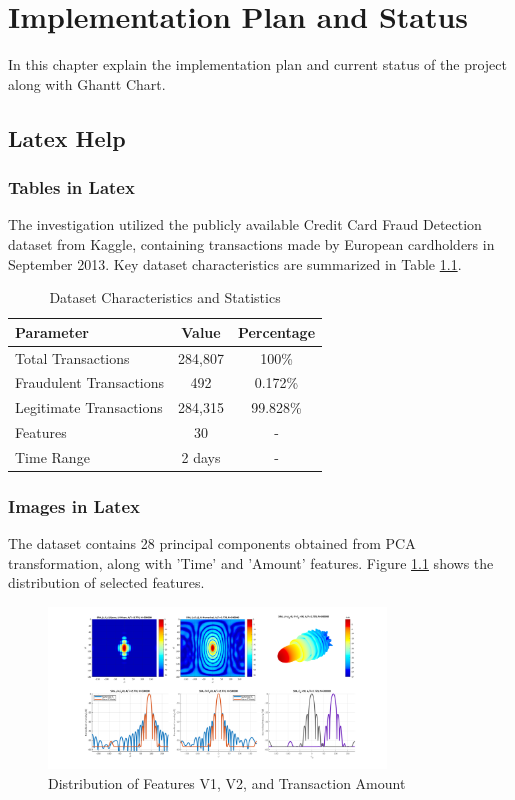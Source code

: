 \chapter{Implementation Plan and Status}
In this chapter explain the implementation plan and current status of the project along with Ghantt Chart.
	
\section{Latex Help}

\subsection{Tables in Latex}
The investigation utilized the publicly available Credit Card Fraud Detection dataset from Kaggle, containing transactions made by European cardholders in September 2013. Key dataset characteristics are summarized in Table \ref{tab:dataset_stats}.

\begin{table}[h!]
\centering
\caption{Dataset Characteristics and Statistics}
\label{tab:dataset_stats}
\begin{tabular}{lcc}
\toprule
\textbf{Parameter} & \textbf{Value} & \textbf{Percentage} \\
\midrule
Total Transactions & 284,807 & 100\% \\
Fraudulent Transactions & 492 & 0.172\% \\
Legitimate Transactions & 284,315 & 99.828\% \\
Features & 30 & - \\
Time Range & 2 days & - \\
\bottomrule
\end{tabular}
\end{table}

\subsection{Images in Latex}

The dataset contains 28 principal components obtained from PCA transformation, along with 'Time' and 'Amount' features. Figure \ref{fig:feature_dist} shows the distribution of selected features.

\begin{figure}[h!]
\centering
\includegraphics[width=0.8\textwidth]{images/feature_distribution.png}
\caption{Distribution of Features V1, V2, and Transaction Amount}
\label{fig:feature_dist}
\end{figure}



